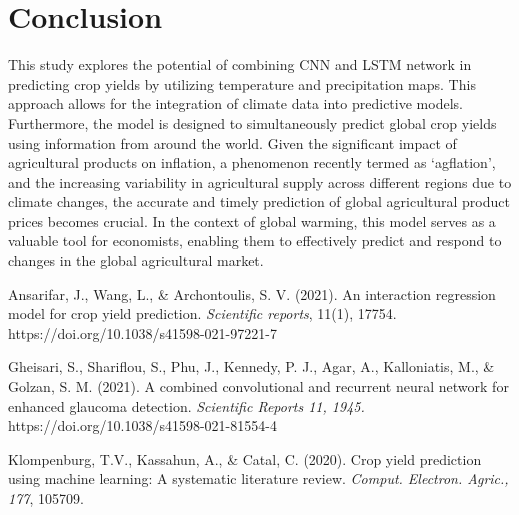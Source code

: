 \documentclass[11pt, oneside]{article}   	%
\begin{document}
\section*{Conclusion}

This study explores the potential of combining CNN and LSTM network in predicting crop yields by utilizing temperature and precipitation maps. This approach allows for the integration of climate data into predictive models. Furthermore, the model is designed to simultaneously predict global crop yields using information from around the world. Given the significant impact of agricultural products on inflation, a phenomenon recently termed as ‘agflation’, and the increasing variability in agricultural supply across different regions due to climate changes, the accurate and timely prediction of global agricultural product prices becomes crucial. In the context of global warming, this model serves as a valuable tool for economists, enabling them to effectively predict and respond to changes in the global agricultural market.

\begin{thebibliography}{9}

Ansarifar, J., Wang, L., \& Archontoulis, S. V. (2021). An interaction regression model for crop yield prediction. \textit{Scientific reports}, 11(1), 17754. https://doi.org/10.1038/s41598-021-97221-7

Gheisari, S., Shariflou, S., Phu, J., Kennedy, P. J., Agar, A., Kalloniatis, M., \& Golzan, S. M. (2021). A combined convolutional and recurrent neural network for enhanced glaucoma detection. \textit{Scientific Reports 11, 1945.} https://doi.org/10.1038/s41598-021-81554-4

Klompenburg, T.V., Kassahun, A., \& Catal, C. (2020). Crop yield prediction using machine learning: A systematic literature review. \textit{Comput. Electron. Agric., 177}, 105709.

\end{thebibliography}
\end{document}
